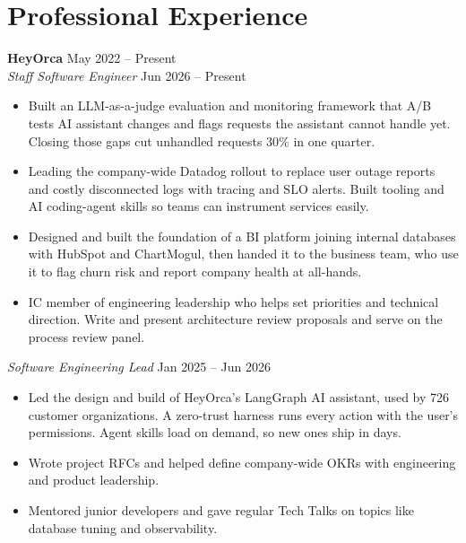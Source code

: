 \documentclass[11pt]{article}
\begin{document}
\section*{Professional Experience}
\textbf{HeyOrca} \hfill May 2022 -- Present \\
\textit{Staff Software Engineer} \hfill Jun 2026 -- Present
\begin{itemize}
    \item Built an LLM-as-a-judge evaluation and monitoring framework that A/B tests AI assistant changes and flags requests the assistant cannot handle yet. Closing those gaps cut unhandled requests 30\% in one quarter.
    \item Leading the company-wide Datadog rollout to replace user outage reports and costly disconnected logs with tracing and SLO alerts. Built tooling and AI coding-agent skills so teams can instrument services easily.
    \item Designed and built the foundation of a BI platform joining internal databases with HubSpot and ChartMogul, then handed it to the business team, who use it to flag churn risk and report company health at all-hands.
    \item IC member of engineering leadership who helps set priorities and technical direction. Write and present architecture review proposals and serve on the process review panel.
\end{itemize}

\vspace{3pt}
\textit{Software Engineering Lead} \hfill Jan 2025 -- Jun 2026
\begin{itemize}
    \item Led the design and build of HeyOrca's LangGraph AI assistant, used by 726 customer organizations. A zero-trust harness runs every action with the user's permissions. Agent skills load on demand, so new ones ship in days.
    \item Wrote project RFCs and helped define company-wide OKRs with engineering and product leadership.
    \item Mentored junior developers and gave regular Tech Talks on topics like database tuning and observability.
\end{itemize}
\end{document}
